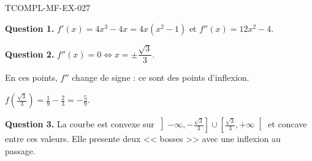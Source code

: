 \begin{corrige}{TCOMPL-MF-EX-027}

\textbf{Question 1.} $f'(x) = 4x^3 - 4x = 4x(x^2-1)$ et $f''(x) = 12x^2 - 4$.


\textbf{Question 2.} $f''(x) = 0 \iff x = \pm\dfrac{\sqrt{3}}{3}$.

En ces points, $f''$ change de signe : ce sont des points d'inflexion.

$\displaystyle f\!\left(\frac{\sqrt{3}}{3}\right) = \frac{1}{9} - \frac{2}{3} = -\frac{5}{9}$.

\textbf{Question 3.} La courbe est convexe sur $\left]-\infty, -\frac{\sqrt3}{3}\right] \cup \left[\frac{\sqrt3}{3}, +\infty\right[$ et concave entre ces valeurs. Elle presente deux << bosses >> avec une inflexion au passage.

\end{corrige}
